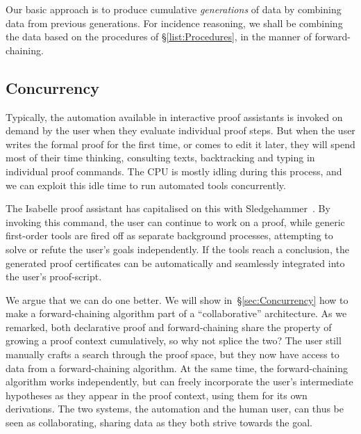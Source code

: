 Our basic approach is to produce cumulative \emph{generations} of data by combining data from previous generations. For incidence reasoning, we shall be combining the data based on the procedures of \S\ref{list:Procedures}, in the manner of forward-chaining.

\subsection{Concurrency}\label{sec:NaiveConcurrency}
Typically, the automation available in interactive proof assistants is invoked on demand by the user when they evaluate individual proof steps. But when the user writes the formal proof for the first time, or comes to edit it later, they will spend most of their time thinking, consulting texts, backtracking and typing in individual proof commands. The CPU is mostly idling during this process, and we can exploit this idle time to run automated tools concurrently.

The Isabelle proof assistant has capitalised on this with Sledgehammer~\cite{IsabelleSledgehammer}. By invoking this command, the user can continue to work on a proof, while generic first-order tools are fired off as separate background processes, attempting to solve or refute the user's goals independently. If the tools reach a conclusion, the generated proof certificates can be automatically and seamlessly integrated into the user's proof-script. 

We argue that we can do one better. We will show in~\S\ref{sec:Concurrency} how to make a forward-chaining algorithm part of a ``collaborative'' architecture. As we remarked, both declarative proof and forward-chaining share the property of growing a proof context cumulatively, so why not splice the two? The user still manually crafts a search through the proof space, but they now have access to data from a forward-chaining algorithm. At the same time, the forward-chaining algorithm works independently, but can freely incorporate the user's intermediate hypotheses as they appear in the proof context, using them for its own derivations. The two systems, the automation and the human user, can thus be seen as collaborating, sharing data as they both strive towards the goal.


